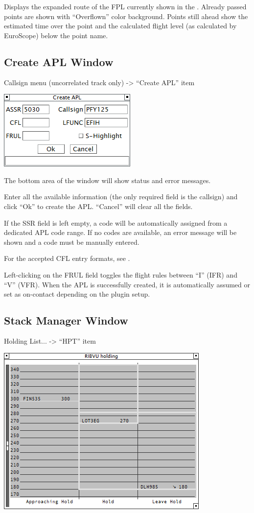\documentclass[11pt,a4paper,oldfontcommands]{memoir}
\begin{document}
Displays the expanded route of the FPL currently shown in the \textit{}. Already passed points are shown with “Overflown” color background. Points still ahead show the estimated time over the point and the calculated flight level (as calculated by EuroScope) below the point name.

\subsection{Create APL Window}
\label{win:apl}

Callsign menu (uncorrelated track only) -> “Create APL” item

\includegraphics{img/apl2.png}

The bottom area of the window will show status and error messages.

Enter all the available information (the only required field is the callsign) and click “Ok” to create the APL. “Cancel” will clear all the fields.

If the SSR field is left empty, a code will be automatically assigned from a dedicated APL code range. If no codes are available, an error message will be shown and a code must be manually entered.

For the accepted CFL entry formats, see \textit{}.

Left-clicking on the FRUL field toggles the flight rules between “I” (IFR) and “V” (VFR).
When the APL is successfully created, it is automatically assumed or set as on-contact depending on the plugin setup.

\subsection{Stack Manager Window}
\label{win:smw}
Holding List... -> “HPT” item

\includegraphics{img/stackman.png}
\end{document}
